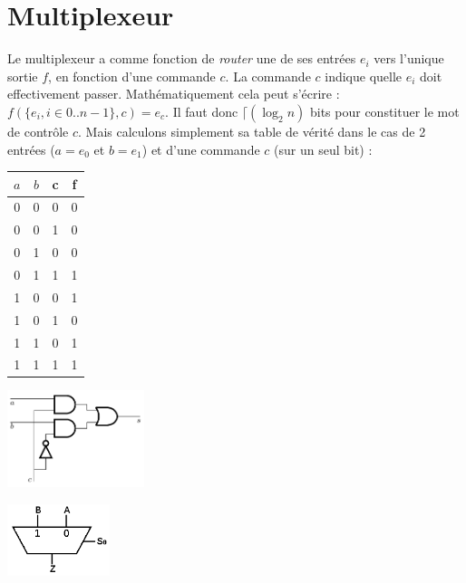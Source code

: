 \section{Multiplexeur}
Le multiplexeur a comme fonction de {\it router} une de ses entrées $e_i$ vers l'unique sortie $f$, en fonction d'une commande $c$.
La commande $c$ indique quelle $e_i$ doit effectivement passer. Mathématiquement cela peut s'écrire : $f(\{e_i,i \in 0..n-1\},c)=e_{c}$.
Il faut donc $\lceil(\log_2{n})$ bits pour constituer le mot de contrôle $c$.
Mais calculons simplement sa table de vérité dans le cas de 2 entrées ($a=e_0$ et $b=e_1$) et d'une commande $c$ (sur un seul bit) :
\begin{center}
   \begin{minipage}[t]{4cm}
     \vspace{0pt}
     \centering
     \begin{tabular}{|c|c|c||c|}
       \hline
       $a$ & $b$ &  c  &  f \\ \hline
       0 & 0 &  0  &  0 \\ \hline
       0 & 0 &  1  &  0 \\ \hline
       0 & 1 &  0  &  0 \\ \hline
       0 & 1 &  1  &  1 \\ \hline
       1 & 0 &  0  &  1 \\ \hline
       1 & 0 &  1  &  0 \\ \hline
       1 & 1 &  0  &  1 \\ \hline
       1 & 1 &  1  &  1 \\ \hline
     \end{tabular}
   \end{minipage}%
   \begin{minipage}[t]{5cm}
     \vspace{5pt}
     \centering
     \includegraphics[width=4cm]{./figures/mux.png}
   \end{minipage}
   \begin{minipage}[t]{5cm}
     \vspace{0pt}
     \centering
     \includegraphics[width=3cm]{./figures/mux2to1.png}
   \end{minipage}
\end{center} %


